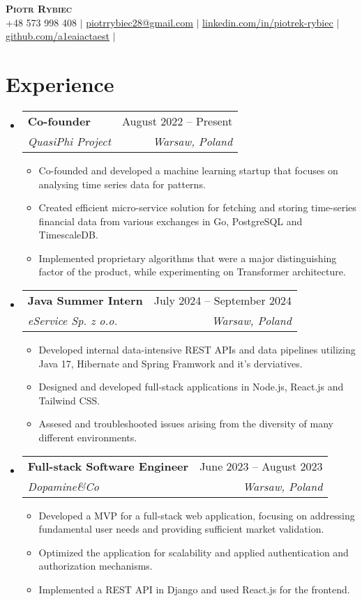 \documentclass[letterpaper,11pt]{article}
\makeatletter
\newcommand{\resumeItem}[1]{
  \item\small{
    {#1 \vspace{-2pt}}
  }
}
\newcommand{\resumeSubheading}[4]{
  \vspace{-2pt}\item
    \begin{tabular*}{0.97\textwidth}[t]{l@{\extracolsep{\fill}}r}
      \textbf{#1} & #2 \\
      \textit{\small#3} & \textit{\small #4} \\
    \end{tabular*}\vspace{-7pt}
}
\newcommand{\resumeSubHeadingListStart}{\begin{itemize}[leftmargin=0.15in, label={}]}
\newcommand{\resumeSubHeadingListEnd}{\end{itemize}}
\newcommand{\resumeItemListStart}{\begin{itemize}}
\newcommand{\resumeItemListEnd}{\end{itemize}\vspace{-5pt}}
\makeatother
\begin{document}
\begin{center}
  \textbf{\Huge \scshape Piotr Rybiec} \\ \vspace{1pt}
  \small +48 573 998 408 $|$ \href{mailto:piotrrybiec28@gmail.com}{\underline{piotrrybiec28@gmail.com}} $|$
  \href{https://linkedin.com/in/piotrek-rybiec}{\underline{linkedin.com/in/piotrek-rybiec}} $|$
  \href{https://github.com/a1eaiactaest}{\underline{github.com/a1eaiactaest}} $|$
\end{center}

\section{Experience}
  \resumeSubHeadingListStart
    \resumeSubheading
      {Co-founder}{August 2022 -- Present}
      {QuasiPhi Project}{Warsaw, Poland}
      \resumeItemListStart
        \resumeItem{Co-founded and developed a machine learning startup that focuses on analysing time series data for patterns.}
        \resumeItem{Created efficient micro-service solution for fetching and storing time-series financial data from various exchanges in Go, PostgreSQL and TimescaleDB.}
        \resumeItem{Implemented proprietary algorithms that were a major distinguishing factor of the product, while experimenting on Transformer architecture.}
      \resumeItemListEnd
    \resumeSubheading
      {Java Summer Intern}{July 2024 -- September 2024}
      {eService Sp. z o.o.}{Warsaw, Poland}
      \resumeItemListStart
        \resumeItem{Developed internal data-intensive REST APIs and data pipelines utilizing Java 17, Hibernate and Spring Framwork and it's derviatives.}
        \resumeItem{Designed and developed full-stack applications in Node.js, React.js and Tailwind CSS.}
        \resumeItem{Assesed and troubleshooted issues arising from the diversity of many different environments.}
      \resumeItemListEnd
    \resumeSubheading
      {Full-stack Software Engineer}{June 2023 -- August 2023}
      {Dopamine\&Co}{Warsaw, Poland}
      \resumeItemListStart
        \resumeItem{Developed a MVP for a full-stack web application, focusing on addressing fundamental user needs and providing sufficient market validation.}
        \resumeItem{Optimized the application for scalability and applied authentication and authorization mechanisms.}
        \resumeItem{Implemented a REST API in Django and used React.js for the frontend.}
      \resumeItemListEnd
  \resumeSubHeadingListEnd
\end{document}
